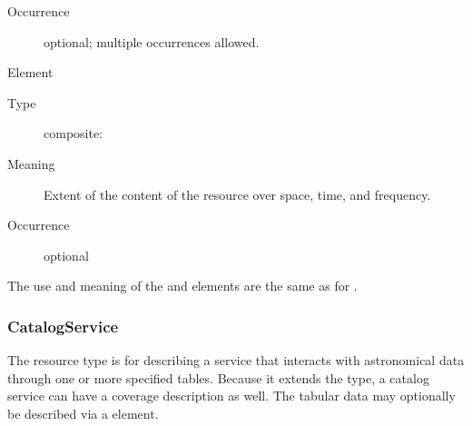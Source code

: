 \documentclass[11pt,a4paper]{ivoa}
\begin{document}
\begin{generated}
\begin{bigdescription}
\begin{description}
\item[Occurrence] optional; multiple occurrences allowed.

\end{description}
\item[Element \xmlel{coverage}]
\begin{description}
\item[Type] composite: 
\item[Meaning] 
                     Extent of the content of the resource over space, time, 
                     and frequency.
                   
\item[Occurrence] optional

\end{description}


\end{bigdescription}\endgroup

\endgroup
\end{generated}


The use and meaning of the  and
 elements are the same as for
.



\subsubsection{CatalogService}
\label{sect:catalogservice}


The  resource type is for describing a
service that interacts with astronomical data through one or more
specified tables.  Because it extends the 
type, a catalog service can have a coverage description as well.  The
tabular data may optionally be described via a
 element.
\end{document}
